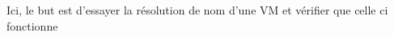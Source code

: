\documentclass[../file_doc_script.tex]{subfiles}
\begin{document}
Ici, le but est d'essayer la résolution de nom d'une VM et vérifier que celle ci 
fonctionne

\UseRawInputEncoding

\end{document}

